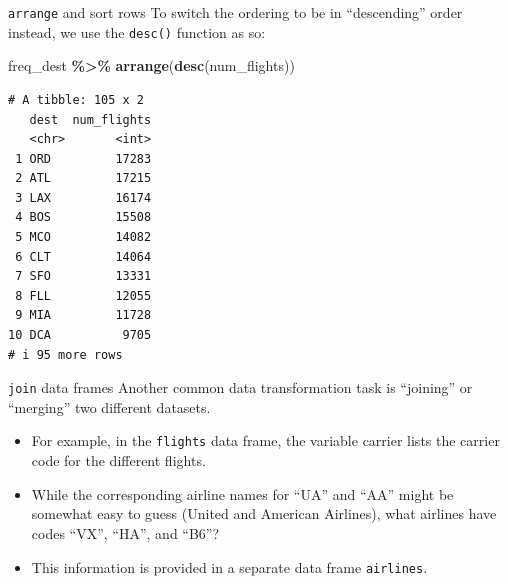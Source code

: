 \documentclass[
  ignorenonframetext,
]{beamer}
\newenvironment{Shaded}{\begin{snugshade}}{\end{snugshade}}
\newcommand{\FunctionTok}[1]{\textcolor[rgb]{0.13,0.29,0.53}{\textbf{#1}}}
\newcommand{\NormalTok}[1]{#1}
\newcommand{\SpecialCharTok}[1]{\textcolor[rgb]{0.81,0.36,0.00}{\textbf{#1}}}
\begin{document}
\begin{frame}[fragile]{\texttt{arrange} and sort rows}
\protect\hypertarget{arrange-and-sort-rows-3}{}
To switch the ordering to be in ``descending'' order instead, we use the
\texttt{desc()} function as so:

\tiny

\begin{Shaded}
\begin{Highlighting}[]
\NormalTok{freq\_dest }\SpecialCharTok{\%\textgreater{}\%} 
  \FunctionTok{arrange}\NormalTok{(}\FunctionTok{desc}\NormalTok{(num\_flights))}
\end{Highlighting}
\end{Shaded}

\begin{verbatim}
# A tibble: 105 x 2
   dest  num_flights
   <chr>       <int>
 1 ORD         17283
 2 ATL         17215
 3 LAX         16174
 4 BOS         15508
 5 MCO         14082
 6 CLT         14064
 7 SFO         13331
 8 FLL         12055
 9 MIA         11728
10 DCA          9705
# i 95 more rows
\end{verbatim}

\normalsize
\end{frame}

\begin{frame}[fragile]{\texttt{join} data frames}
\protect\hypertarget{join-data-frames}{}
Another common data transformation task is ``joining'' or ``merging''
two different datasets.

\begin{itemize}
\item
  For example, in the \texttt{flights} data frame, the variable carrier
  lists the carrier code for the different flights.
\item
  While the corresponding airline names for ``UA'' and ``AA'' might be
  somewhat easy to guess (United and American Airlines), what airlines
  have codes ``VX'', ``HA'', and ``B6''?
\item
  This information is provided in a separate data frame
  \texttt{airlines}.
\end{itemize}
\end{frame}
\end{document}
